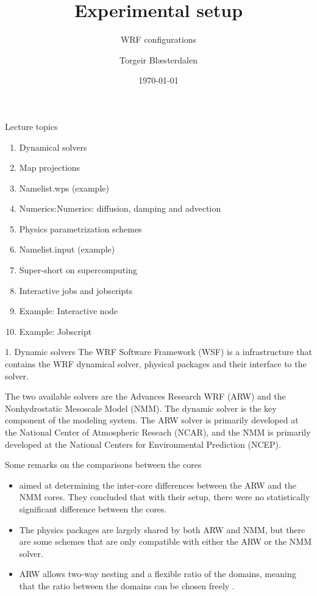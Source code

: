 \documentclass{beamer}
\title{Experimental setup}
\subtitle{WRF configurations}
\author{Torgeir Blæsterdalen}
\institute{Department of Industrial Engineering, UiT-The Arctic University of Norway}
\date{\today}
\begin{document}
\begin{frame}
\titlepage
\end{frame}


\begin{frame}{Lecture topics}
\begin{enumerate}
	\item Dynamical solvers
	\item Map projections
	\item Namelist.wps (example)
	\item Numerics:Numerics: diffusion, damping and advection
	\item Physics parametrization schemes
	\item Namelist.input (example)
	\item Super-short on supercomputing
	\item Interactive jobs and jobscripts
	\item Example: Interactive node
	\item Example: Jobscript
\end{enumerate}
\end{frame}


\begin{frame}[fragile, allowframebreaks=1, t]{1. Dynamic solvers}
The WRF Software Framework (WSF) is a infrastructure that contains the WRF dynamical solver, physical packages and their interface to the solver.

The two available solvers are the Advances Research WRF (ARW) and the Nonhydrostatic Mesoscale Model (NMM). 
The dynamic solver is the key component of the modeling system. The ARW solver is primarily developed at the National Center of Atmospheric Reseach (NCAR), and the NMM is primarily developed at the National Centers for Environmental Prediction (NCEP). 

Some remarks on the comparisons between the cores
\begin{itemize}
	\item \citet{bernardetcomparison} aimed at determining the inter-core differences between the ARW and the NMM cores. They concluded that with their setup, there were no statistically significant difference between the cores. 
	\item The physics packages are largely shared by both ARW and NMM, but there are some schemes that are only compatible with either the ARW or the NMM solver.
	\item ARW allows two-way nesting and a flexible ratio of the domains, meaning that the ratio between the domains can be chosen freely \citep{skamarock2008description}.
\end{itemize}


\end{frame}
\end{document}
